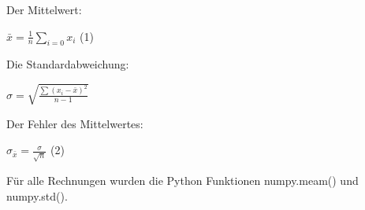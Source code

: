 Der Mittelwert:
\begin{center}
$\bar{x}=\frac{1}{n}\sum\nolimits_{i=0} x_i$ (1)
\end{center}

Die Standardabweichung:
\begin{center}
$\sigma=\sqrt{\frac{\sum(x_i-\bar{x})^2}{n-1}}$
  
\end{center}

Der Fehler des Mittelwertes:
\begin{center}
$\sigma_{\bar{x}}=\frac{\sigma}{\sqrt{n}}$ (2)
  
\end{center}

Für alle Rechnungen wurden die Python Funktionen numpy.meam() und numpy.std().



